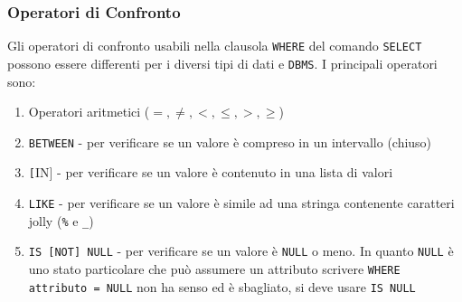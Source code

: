         \subsubsection{Operatori di Confronto} 
            Gli operatori di confronto usabili nella clausola \texttt{WHERE} del comando \texttt{SELECT} possono essere differenti per i diversi tipi di dati e \texttt{DBMS}. I principali operatori sono:
                \begin{enumerate}
                    \item Operatori aritmetici ($=, \neq, <, \leq, >, \geq$)
                    \item \texttt{BETWEEN} - per verificare se un valore è compreso in un intervallo (chiuso)
                    \item \texttt[IN] - per verificare se un valore è contenuto in una lista di valori
                    \item \texttt{LIKE} - per verificare se un valore è simile ad una stringa contenente caratteri jolly (\texttt{\%} e \texttt{\_})
                    \item \texttt{IS [NOT] NULL} - per verificare se un valore è \texttt{NULL} o meno. In quanto \texttt{NULL} è uno stato particolare che può assumere un attributo scrivere \texttt{WHERE attributo = NULL} non ha senso ed è sbagliato, si deve usare \texttt{IS NULL}
                \end{enumerate}

